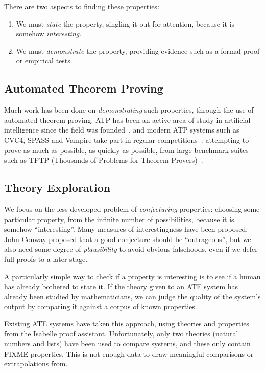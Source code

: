 \documentclass[]{default}
\begin{document}
There are two aspects to finding these properties:

\begin{enumerate}
\item We must \emph{state} the property, singling it out for attention, because
  it is somehow \emph{interesting}.

\item We must \emph{demonstrate} the property, providing evidence such as a
  formal proof or empirical tests.
\end{enumerate}

\subsection{Automated Theorem Proving}

Much work has been done on \emph{demonstrating} such properties, through the use
of automated theorem proving. ATP has been an active area of study in artificial
intelligence since the field was founded~\cite{newell1956logic,
  sutcliffe2001evaluating}, and modern ATP systems such as CVC4, SPASS and
Vampire take part in regular competitions~\cite{CASC}: attempting to prove as
much as possible, as quickly as possible, from large benchmark suites such as
TPTP (Thousands of Problems for Theorem Provers)~\cite{TPTP}.

\subsection{Theory Exploration}

We focus on the less-developed problem of \emph{conjecturing} properties:
choosing some particular property, from the infinite number of possibilities,
because it is somehow ``interesting''. Many measures of interestingness have
been proposed\cite{INTERESTING}; John Conway proposed that a good conjecture
should be ``outrageous''\cite{CONWAY}, but we also need some degree of
\emph{plausibility} to avoid obvious falsehoods, even if we defer full proofs
to a later stage.

A particularly simple way to check if a property is interesting is to see if a
human has already bothered to state it. If the theory given to an ATE system has
already been studied by mathematicians, we can judge the quality of the system's
output by comparing it against a corpus of known properties.

Existing ATE systems have taken this approach, using theories and properties
from the Isabelle proof assistant. Unfortunately, only two theories (natural
numbers and lists) have been used to compare systems, and these only contain
FIXME properties. This is not enough data to draw meaningful comparisons or
extrapolations from.
\end{document}
